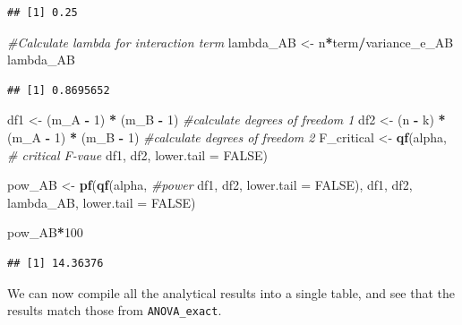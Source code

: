 \documentclass[
]{book}
\newenvironment{Shaded}{\begin{snugshade}}{\end{snugshade}}
\newcommand{\CommentTok}[1]{\textcolor[rgb]{0.56,0.35,0.01}{\textit{#1}}}
\newcommand{\DataTypeTok}[1]{\textcolor[rgb]{0.13,0.29,0.53}{#1}}
\newcommand{\DecValTok}[1]{\textcolor[rgb]{0.00,0.00,0.81}{#1}}
\newcommand{\KeywordTok}[1]{\textcolor[rgb]{0.13,0.29,0.53}{\textbf{#1}}}
\newcommand{\NormalTok}[1]{#1}
\newcommand{\OperatorTok}[1]{\textcolor[rgb]{0.81,0.36,0.00}{\textbf{#1}}}
\newcommand{\OtherTok}[1]{\textcolor[rgb]{0.56,0.35,0.01}{#1}}
\newcommand{\StringTok}[1]{\textcolor[rgb]{0.31,0.60,0.02}{#1}}
\begin{document}
\begin{verbatim}
## [1] 0.25
\end{verbatim}

\begin{Shaded}
\begin{Highlighting}[]
\CommentTok{#Calculate lambda for interaction term}
\NormalTok{lambda_AB <-}\StringTok{ }\NormalTok{n}\OperatorTok{*}\NormalTok{term}\OperatorTok{/}\NormalTok{variance_e_AB}
\NormalTok{lambda_AB}
\end{Highlighting}
\end{Shaded}

\begin{verbatim}
## [1] 0.8695652
\end{verbatim}

\begin{Shaded}
\begin{Highlighting}[]
\NormalTok{df1 <-}\StringTok{ }\NormalTok{(m_A }\OperatorTok{-}\StringTok{ }\DecValTok{1}\NormalTok{) }\OperatorTok{*}\StringTok{ }\NormalTok{(m_B }\OperatorTok{-}\StringTok{ }\DecValTok{1}\NormalTok{)  }\CommentTok{#calculate degrees of freedom 1}
\NormalTok{df2 <-}
\NormalTok{(n }\OperatorTok{-}\StringTok{ }\NormalTok{k) }\OperatorTok{*}\StringTok{ }\NormalTok{(m_A }\OperatorTok{-}\StringTok{ }\DecValTok{1}\NormalTok{) }\OperatorTok{*}\StringTok{ }\NormalTok{(m_B }\OperatorTok{-}\StringTok{ }\DecValTok{1}\NormalTok{) }\CommentTok{#calculate degrees of freedom 2}
\NormalTok{F_critical <-}\StringTok{ }\KeywordTok{qf}\NormalTok{(alpha, }\CommentTok{# critical F-vaue}
\NormalTok{df1,}
\NormalTok{df2,}
\DataTypeTok{lower.tail =} \OtherTok{FALSE}\NormalTok{)}

\NormalTok{pow_AB <-}\StringTok{ }\KeywordTok{pf}\NormalTok{(}\KeywordTok{qf}\NormalTok{(alpha, }\CommentTok{#power}
\NormalTok{df1,}
\NormalTok{df2,}
\DataTypeTok{lower.tail =} \OtherTok{FALSE}\NormalTok{),}
\NormalTok{df1,}
\NormalTok{df2,}
\NormalTok{lambda_AB,}
\DataTypeTok{lower.tail =} \OtherTok{FALSE}\NormalTok{)}

\NormalTok{pow_AB}\OperatorTok{*}\DecValTok{100}
\end{Highlighting}
\end{Shaded}

\begin{verbatim}
## [1] 14.36376
\end{verbatim}

We can now compile all the analytical results into a single table, and see that the results match those from \texttt{ANOVA\_exact}.
\end{document}
